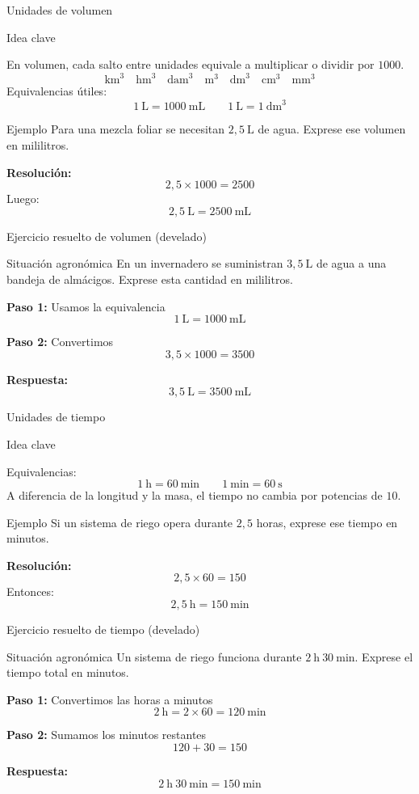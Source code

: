 \documentclass[aspectratio=169,10pt]{beamer}
\newcommand{\idea}[1]{
	\begin{block}{Idea clave}
		#1
	\end{block}
}
\newcommand{\ejemplo}[2]{
	\begin{exampleblock}{Ejemplo}
		#1
		
		\vspace{0.5em}
		\textbf{Resolución:} #2
	\end{exampleblock}
}
\begin{document}
	\begin{frame}{Unidades de volumen}
		\idea{
			En volumen, cada salto entre unidades equivale a multiplicar o dividir por \(1000\).
			\[
			\text{km}^3 \quad \text{hm}^3 \quad \text{dam}^3 \quad \text{m}^3 \quad \text{dm}^3 \quad \text{cm}^3 \quad \text{mm}^3
			\]
			Equivalencias útiles:
			\[
			1\ \text{L} = 1000\ \text{mL}
			\qquad
			1\ \text{L} = 1\ \text{dm}^3
			\]
		}
		
		\pause
		\ejemplo
		{Para una mezcla foliar se necesitan \(2{,}5\ \text{L}\) de agua. Exprese ese volumen en mililitros.}
		{
			\[
			2{,}5 \times 1000 = 2500
			\]
			Luego:
			\[
			2{,}5\ \text{L} = \boxed{2500\ \text{mL}}
			\]
		}
	\end{frame}
	
	\begin{frame}{Ejercicio resuelto de volumen (develado)}
		\begin{block}{Situación agronómica}
			En un invernadero se suministran \(3{,}5\ \text{L}\) de agua a una bandeja de almácigos.  
			Exprese esta cantidad en mililitros.
		\end{block}
		
		\pause
		\textbf{Paso 1:} Usamos la equivalencia
		\[
		1\ \text{L} = 1000\ \text{mL}
		\]
		
		\pause
		\textbf{Paso 2:} Convertimos
		\[
		3{,}5 \times 1000 = 3500
		\]
		
		\pause
		\textbf{Respuesta:}
		\[
		3{,}5\ \text{L} = \boxed{3500\ \text{mL}}
		\]
	\end{frame}
	
	\begin{frame}{Unidades de tiempo}
		\idea{
			Equivalencias:
			\[
			1\ \text{h} = 60\ \text{min}
			\qquad
			1\ \text{min} = 60\ \text{s}
			\]
			A diferencia de la longitud y la masa, el tiempo no cambia por potencias de \(10\).
		}
		
		\pause
		\ejemplo
		{Si un sistema de riego opera durante \(2{,}5\) horas, exprese ese tiempo en minutos.}
		{
			\[
			2{,}5 \times 60 = 150
			\]
			Entonces:
			\[
			2{,}5\ \text{h} = \boxed{150\ \text{min}}
			\]
		}
	\end{frame}
	
	\begin{frame}{Ejercicio resuelto de tiempo (develado)}
		\begin{block}{Situación agronómica}
			Un sistema de riego funciona durante \(2\ \text{h}\ 30\ \text{min}\).  
			Exprese el tiempo total en minutos.
		\end{block}
		
		\pause
		\textbf{Paso 1:} Convertimos las horas a minutos
		\[
		2\ \text{h} = 2 \times 60 = 120\ \text{min}
		\]
		
		\pause
		\textbf{Paso 2:} Sumamos los minutos restantes
		\[
		120 + 30 = 150
		\]
		
		\pause
		\textbf{Respuesta:}
		\[
		2\ \text{h}\ 30\ \text{min} = \boxed{150\ \text{min}}
		\]
	\end{frame}
	
\end{document}
